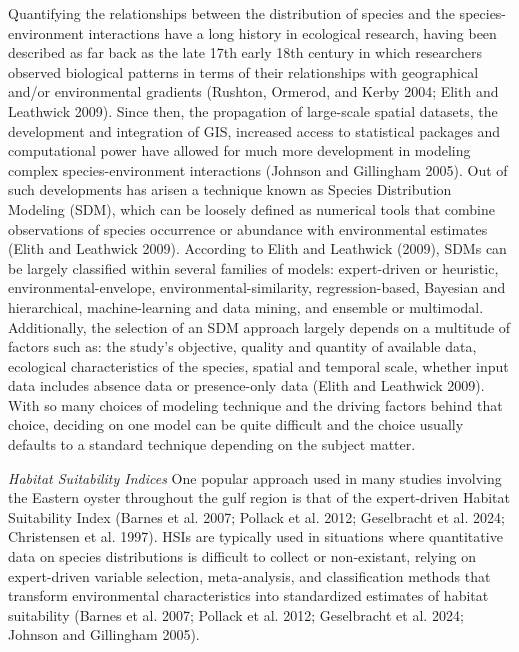 \documentclass[
  letterpaper,
  DIV=11,
  numbers=noendperiod]{scrartcl}
\begin{document}
Quantifying the relationships between the distribution of species and
the species-environment interactions have a long history in ecological
research, having been described as far back as the late 17th early 18th
century in which researchers observed biological patterns in terms of
their relationships with geographical and/or environmental gradients
(Rushton, Ormerod, and Kerby 2004; Elith and Leathwick 2009). Since
then, the propagation of large-scale spatial datasets, the development
and integration of GIS, increased access to statistical packages and
computational power have allowed for much more development in modeling
complex species-environment interactions (Johnson and Gillingham 2005).
Out of such developments has arisen a technique known as Species
Distribution Modeling (SDM), which can be loosely defined as numerical
tools that combine observations of species occurrence or abundance with
environmental estimates (Elith and Leathwick 2009). According to Elith
and Leathwick (2009), SDMs can be largely classified within several
families of models: expert-driven or heuristic, environmental-envelope,
environmental-similarity, regression-based, Bayesian and hierarchical,
machine-learning and data mining, and ensemble or multimodal.
Additionally, the selection of an SDM approach largely depends on a
multitude of factors such as: the study's objective, quality and
quantity of available data, ecological characteristics of the species,
spatial and temporal scale, whether input data includes absence data or
presence-only data (Elith and Leathwick 2009). With so many choices of
modeling technique and the driving factors behind that choice, deciding
on one model can be quite difficult and the choice usually defaults to a
standard technique depending on the subject matter.

\emph{Habitat Suitability Indices} One popular approach used in many
studies involving the Eastern oyster throughout the gulf region is that
of the expert-driven Habitat Suitability Index (Barnes et al. 2007;
Pollack et al. 2012; Geselbracht et al. 2024; Christensen et al. 1997).
HSIs are typically used in situations where quantitative data on species
distributions is difficult to collect or non-existant, relying on
expert-driven variable selection, meta-analysis, and classification
methods that transform environmental characteristics into standardized
estimates of habitat suitability (Barnes et al. 2007; Pollack et al.
2012; Geselbracht et al. 2024; Johnson and Gillingham 2005).
\end{document}
